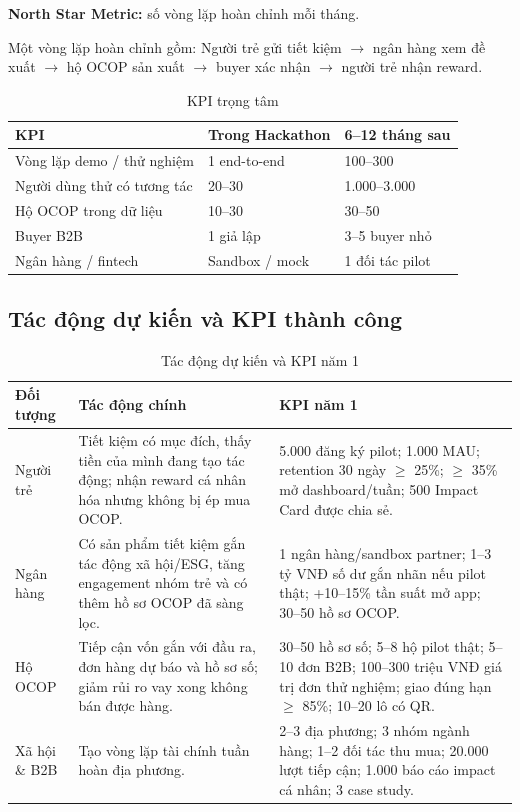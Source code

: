 \documentclass[13pt,a4paper]{extarticle}
\begin{document}
\textbf{North Star Metric:} số vòng lặp hoàn chỉnh mỗi tháng.

Một vòng lặp hoàn chỉnh gồm: Người trẻ gửi tiết kiệm $\rightarrow$ ngân hàng xem đề xuất $\rightarrow$ hộ OCOP sản xuất $\rightarrow$ buyer xác nhận $\rightarrow$ người trẻ nhận reward.

\begin{table}[H]
\centering
\caption{KPI trọng tâm}
\begin{tabular}{|p{5cm}|p{3.5cm}|p{4.5cm}|}
\hline
\textbf{KPI} & \textbf{Trong Hackathon} & \textbf{6--12 tháng sau} \\
\hline
Vòng lặp demo / thử nghiệm & 1 end-to-end & 100--300 \\
\hline
Người dùng thử có tương tác & 20--30 & 1.000--3.000 \\
\hline
Hộ OCOP trong dữ liệu & 10--30 & 30--50 \\
\hline
Buyer B2B & 1 giả lập & 3--5 buyer nhỏ \\
\hline
Ngân hàng / fintech & Sandbox / mock & 1 đối tác pilot \\
\hline
\end{tabular}
\end{table}

\subsection{Tác động dự kiến và KPI thành công}

\begin{table}[H]
\centering
\caption{Tác động dự kiến và KPI năm 1}
\begin{tabular}{|p{2cm}|p{5cm}|p{6.5cm}|}
\hline
\textbf{Đối tượng} & \textbf{Tác động chính} & \textbf{KPI năm 1} \\
\hline
Người trẻ & Tiết kiệm có mục đích, thấy tiền của mình đang tạo tác động; nhận reward cá nhân hóa nhưng không bị ép mua OCOP. & 5.000 đăng ký pilot; 1.000 MAU; retention 30 ngày $\geq$ 25\%; $\geq$ 35\% mở dashboard/tuần; 500 Impact Card được chia sẻ. \\
\hline
Ngân hàng & Có sản phẩm tiết kiệm gắn tác động xã hội/ESG, tăng engagement nhóm trẻ và có thêm hồ sơ OCOP đã sàng lọc. & 1 ngân hàng/sandbox partner; 1--3 tỷ VNĐ số dư gắn nhãn nếu pilot thật; +10--15\% tần suất mở app; 30--50 hồ sơ OCOP. \\
\hline
Hộ OCOP & Tiếp cận vốn gắn với đầu ra, đơn hàng dự báo và hồ sơ số; giảm rủi ro vay xong không bán được hàng. & 30--50 hồ sơ số; 5--8 hộ pilot thật; 5--10 đơn B2B; 100--300 triệu VNĐ giá trị đơn thử nghiệm; giao đúng hạn $\geq$ 85\%; 10--20 lô có QR. \\
\hline
Xã hội \& B2B & Tạo vòng lặp tài chính tuần hoàn địa phương. & 2--3 địa phương; 3 nhóm ngành hàng; 1--2 đối tác thu mua; 20.000 lượt tiếp cận; 1.000 báo cáo impact cá nhân; 3 case study. \\
\hline
\end{tabular}
\end{table}
\end{document}
